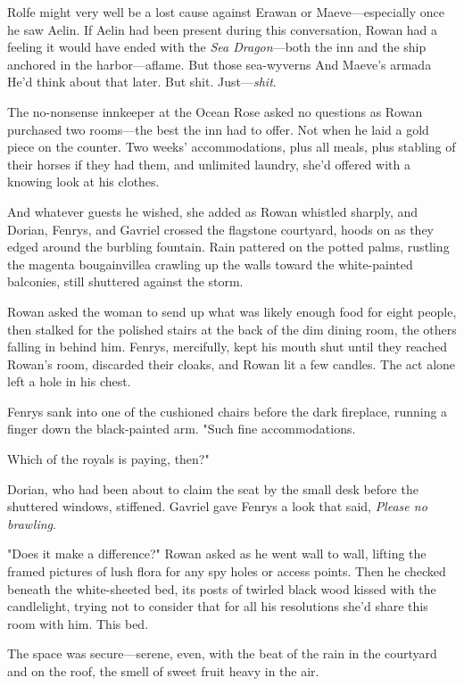 Rolfe might very well be a lost cause against Erawan or Maeve---especially once he saw Aelin. If Aelin had been present during this conversation, Rowan had a feeling it would have ended with the
\emph{Sea Dragon}---both the inn and the ship anchored in the harbor---aflame. But those sea-wyverns  And Maeve's armada
 He'd think about that later. But shit. Just---\emph{shit}.

The no-nonsense innkeeper at the Ocean Rose asked no questions as Rowan purchased two rooms---the best the inn had to offer. Not when he laid a gold piece on the counter. Two weeks' accommodations, plus all meals, plus stabling of their horses if they had them, and unlimited laundry, she'd offered with a knowing look at his clothes.

And whatever guests he wished, she added as Rowan whistled sharply, and Dorian, Fenrys, and Gavriel crossed the flagstone courtyard, hoods on as they edged around the burbling fountain. Rain pattered on the potted palms, rustling the magenta bougainvillea crawling up the walls toward the white-painted balconies, still shuttered against the storm.

Rowan asked the woman to send up what was likely enough food for eight people, then stalked for the polished stairs at the back of the dim dining room, the others falling in behind him. Fenrys, mercifully, kept his mouth shut until they reached Rowan's room, discarded their cloaks, and Rowan lit a few candles. The act alone left a hole in his chest.

Fenrys sank into one of the cushioned chairs before the dark fireplace, running a finger down the black-painted arm. "Such fine accommodations.

Which of the royals is paying, then?"

Dorian, who had been about to claim the seat by the small desk before the shuttered windows, stiffened. Gavriel gave Fenrys a look that said,
\emph{Please no brawling}.

"Does it make a difference?" Rowan asked as he went wall to wall, lifting the framed pictures of lush flora for any spy holes or access points. Then he checked beneath the white-sheeted bed, its posts of twirled black wood kissed with the candlelight, trying not to consider that for all his resolutions  she'd share this room with him. This bed.

The space was secure---serene, even, with the beat of the rain in the courtyard and on the roof, the smell of sweet fruit heavy in the air.

